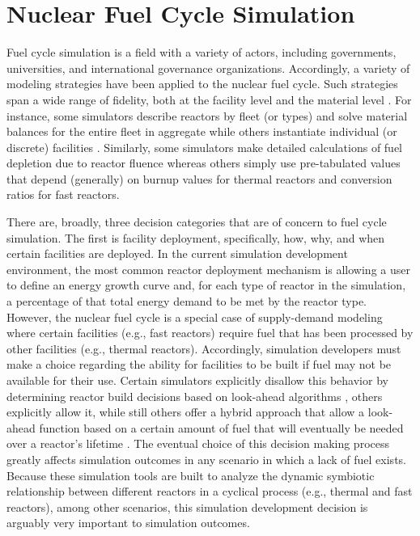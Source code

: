 
\section{Nuclear Fuel Cycle Simulation}\label{intro:fcs}
 
Fuel cycle simulation is a field with a variety of actors, including
governments, universities, and international governance
organizations. Accordingly, a variety of modeling strategies have been applied
to the nuclear fuel cycle. Such strategies span a wide range of fidelity, both
at the facility level and the material level
\cite{boucher_cosi:_2006,busquim_e_silva_system_2008,yacout_vision_2006}. For
instance, some simulators describe reactors by fleet (or types) and solve
material balances for the entire fleet in aggregate while others instantiate
individual (or discrete) facilities \cite{schneider_nfcsim:_2005}. Similarly,
some simulators make detailed calculations of fuel depletion due to reactor
fluence whereas others simply use pre-tabulated values
that depend (generally) on burnup values for thermal reactors and conversion
ratios for fast reactors. 

There are, broadly, three decision categories that are of concern to fuel cycle
simulation. The first is facility deployment, specifically, how, why, and when
certain facilities are deployed. In the current simulation development
environment, the most common reactor deployment mechanism is allowing a user to
define an energy growth curve and, for each type of reactor in the simulation, a
percentage of that total energy demand to be met by the reactor type. However,
the nuclear fuel cycle is a special case of supply-demand modeling where certain
facilities (e.g., fast reactors) require fuel that has been processed by other
facilities (e.g., thermal reactors). Accordingly, simulation developers must
make a choice regarding the ability for facilities to be built if fuel may not
be available for their use. Certain simulators explicitly disallow this behavior
by determining reactor build decisions based on look-ahead algorithms
\cite{schweitzer_improved_2008}, others explicitly allow it, while still others
offer a hybrid approach that allow a look-ahead function based on a certain
amount of fuel that will eventually be needed over a reactor's lifetime
\cite{van_den_durpel_daness_2009}. The eventual choice of this decision making
process greatly affects simulation outcomes in any scenario in which a lack of
fuel exists. Because these simulation tools are built to analyze the dynamic
symbiotic relationship between different reactors in a cyclical process (e.g.,
thermal and fast reactors), among other scenarios, this simulation development
decision is arguably very important to simulation outcomes.

